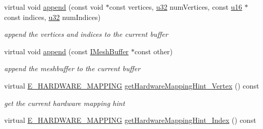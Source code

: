 \begin{DoxyCompactItemize}
\mbox{\label{structirr_1_1scene_1_1SSharedMeshBuffer_af7faf5e2b8245c4be3efb6e766281579}} 
virtual void \hyperlink{structirr_1_1scene_1_1SSharedMeshBuffer_af7faf5e2b8245c4be3efb6e766281579}{append} (const void $\ast$const vertices, \hyperlink{namespaceirr_a0416a53257075833e7002efd0a18e804}{u32} num\+Vertices, const \hyperlink{namespaceirr_ae9f8ec82692ad3b83c21f555bfa70bcc}{u16} $\ast$const indices, \hyperlink{namespaceirr_a0416a53257075833e7002efd0a18e804}{u32} num\+Indices)
\begin{DoxyCompactList}\small\item\em append the vertices and indices to the current buffer \end{DoxyCompactList}\item 
\mbox{\label{structirr_1_1scene_1_1SSharedMeshBuffer_aa4fbcc497cfd0b431bb85d607ed6a2fb}} 
virtual void \hyperlink{structirr_1_1scene_1_1SSharedMeshBuffer_aa4fbcc497cfd0b431bb85d607ed6a2fb}{append} (const \hyperlink{classirr_1_1scene_1_1IMeshBuffer}{I\+Mesh\+Buffer} $\ast$const other)
\begin{DoxyCompactList}\small\item\em append the meshbuffer to the current buffer \end{DoxyCompactList}\item 
\mbox{\label{structirr_1_1scene_1_1SSharedMeshBuffer_a366bdea5fedc452e8ffec4cf14f0e7b4}} 
virtual \hyperlink{namespaceirr_1_1scene_ac7d8ee8d77da75f2580bb9bb17231c27}{E\+\_\+\+H\+A\+R\+D\+W\+A\+R\+E\+\_\+\+M\+A\+P\+P\+I\+NG} \hyperlink{structirr_1_1scene_1_1SSharedMeshBuffer_a366bdea5fedc452e8ffec4cf14f0e7b4}{get\+Hardware\+Mapping\+Hint\+\_\+\+Vertex} () const
\begin{DoxyCompactList}\small\item\em get the current hardware mapping hint \end{DoxyCompactList}\item 
\mbox{\label{structirr_1_1scene_1_1SSharedMeshBuffer_a443fddc1430e9e340f339ec7292a86c4}} 
virtual \hyperlink{namespaceirr_1_1scene_ac7d8ee8d77da75f2580bb9bb17231c27}{E\+\_\+\+H\+A\+R\+D\+W\+A\+R\+E\+\_\+\+M\+A\+P\+P\+I\+NG} \hyperlink{structirr_1_1scene_1_1SSharedMeshBuffer_a443fddc1430e9e340f339ec7292a86c4}{get\+Hardware\+Mapping\+Hint\+\_\+\+Index} () const

\end{DoxyCompactItemize}
